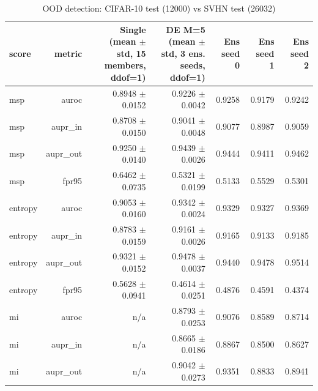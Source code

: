 \begin{table}
\centering
\caption{OOD detection: CIFAR-10 test (12000) vs SVHN test (26032)}
\label{tab:de_ood}
\begin{tabular}{lrrrrrr}
\toprule
    score &                metric & Single (mean $\pm$ std, 15 members, ddof=1) & DE M=5 (mean $\pm$ std, 3 ens. seeds, ddof=1) & Ens seed 0 & Ens seed 1 & Ens seed 2 \\
\midrule
      msp &                 auroc &                         0.8948 $\pm$ 0.0152 &                           0.9226 $\pm$ 0.0042 &     0.9258 &     0.9179 &     0.9242 \\
      msp &               aupr\_in &                         0.8708 $\pm$ 0.0150 &                           0.9041 $\pm$ 0.0048 &     0.9077 &     0.8987 &     0.9059 \\
      msp &              aupr\_out &                         0.9250 $\pm$ 0.0140 &                           0.9439 $\pm$ 0.0026 &     0.9444 &     0.9411 &     0.9462 \\
      msp &                 fpr95 &                         0.6462 $\pm$ 0.0735 &                           0.5321 $\pm$ 0.0199 &     0.5133 &     0.5529 &     0.5301 \\
  entropy &                 auroc &                         0.9053 $\pm$ 0.0160 &                           0.9342 $\pm$ 0.0024 &     0.9329 &     0.9327 &     0.9369 \\
  entropy &               aupr\_in &                         0.8783 $\pm$ 0.0159 &                           0.9161 $\pm$ 0.0026 &     0.9165 &     0.9133 &     0.9185 \\
  entropy &              aupr\_out &                         0.9321 $\pm$ 0.0152 &                           0.9478 $\pm$ 0.0037 &     0.9440 &     0.9478 &     0.9514 \\
  entropy &                 fpr95 &                         0.5628 $\pm$ 0.0941 &                           0.4614 $\pm$ 0.0251 &     0.4876 &     0.4591 &     0.4374 \\
       mi &                 auroc &                                     n/a &                           0.8793 $\pm$ 0.0253 &     0.9076 &     0.8589 &     0.8714 \\
       mi &               aupr\_in &                                     n/a &                           0.8665 $\pm$ 0.0186 &     0.8867 &     0.8500 &     0.8627 \\
       mi &              aupr\_out &                                     n/a &                           0.9042 $\pm$ 0.0273 &     0.9351 &     0.8833 &     0.8941 \\

\end{tabular}
\end{table}
